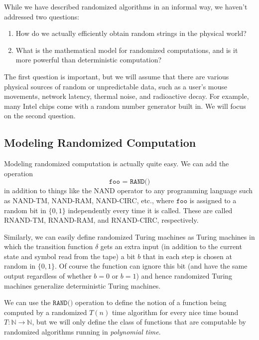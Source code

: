 \documentclass{article}
\begin{document}
  While we have described randomized algorithms in an informal way, we haven't addressed two questions: 
  \begin{enumerate}
      \item How do we actually efficiently obtain random strings in the physical world? 
      \item What is the mathematical model for randomized computations, and is it more powerful than deterministic computation? 
  \end{enumerate}
  The first question is important, but we will assume that there are various physical sources of random or unpredictable data, such as a user's mouse movements, network latency, thermal noise, and radioactive decay. For example, many Intel chips come with a random number generator built in. We will focus on the second question. 

  \subsection{Modeling Randomized Computation}
  Modeling randomized computation is actually quite easy. We can add the operation
  \[\texttt{foo = RAND()}\]
  in addition to things like the NAND operator to any programming language such as NAND-TM, NAND-RAM, NAND-CIRC, etc., where $\texttt{foo}$ is assigned to a random bit in $\{0,1\}$ independently every time it is called. These are called RNAND-TM, RNAND-RAM, and RNAND-CIRC, respectively. 

  Similarly, we can easily define randomized Turing machines as Turing machines in which the transition function $\delta$ gets an extra input (in addition to the current state and symbol read from the tape) a bit $b$ that in each step is chosen at random in $\{0, 1\}$. Of course the function can ignore this bit (and have the same output regardless of whether $b = 0$ or $b= 1$) and hence randomized Turing machines generalize deterministic Turing machines. 

  We can use the $\texttt{RAND()}$ operation to define the notion of a function being computed by a randomized $T(n)$ time algorithm for every nice time bound $T: \mathbb{N} \longrightarrow \mathbb{N}$, but we will only define the class of functions that are computable by randomized algorithms running in \textit{polynomial time}. 
\end{document}
